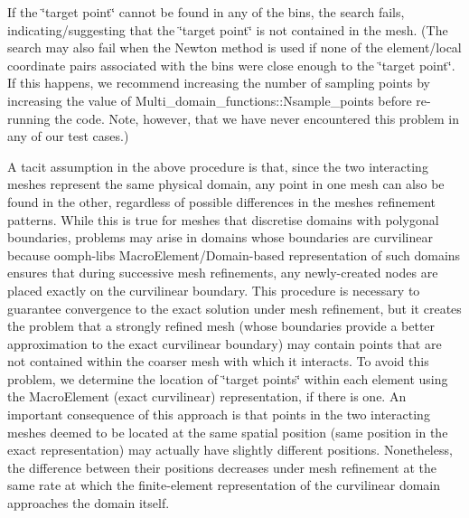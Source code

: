 \begin{DoxyEnumerate}
\item If the \char`\"{}target point\char`\"{} cannot be found in any of the bins, the search fails, indicating/suggesting that the \char`\"{}target point\char`\"{} is not contained in the mesh. (The search may also fail when the Newton method is used if none of the element/local coordinate pairs associated with the bins were close enough to the \char`\"{}target point\char`\"{}. If this happens, we recommend increasing the number of sampling points by increasing the value of {\ttfamily Multi\+\_\+domain\+\_\+functions\+::\+Nsample\+\_\+points} before re-\/running the code. Note, however, that we have never encountered this problem in any of our test cases.)
\end{DoxyEnumerate}A tacit assumption in the above procedure is that, since the two interacting meshes represent the same physical domain, any point in one mesh can also be found in the other, regardless of possible differences in the meshes\textquotesingle{} refinement patterns. While this is true for meshes that discretise domains with polygonal boundaries, problems may arise in domains whose boundaries are curvilinear because {\ttfamily oomph-\/lib\textquotesingle{}s} {\ttfamily Macro\+Element/\+Domain}-\/based representation of such domains ensures that during successive mesh refinements, any newly-\/created nodes are placed exactly on the curvilinear boundary. This procedure is necessary to guarantee convergence to the exact solution under mesh refinement, but it creates the problem that a strongly refined mesh (whose boundaries provide a better approximation to the exact curvilinear boundary) may contain points that are not contained within the coarser mesh with which it interacts. To avoid this problem, we determine the location of \char`\"{}target points\char`\"{} within each element using the {\ttfamily Macro\+Element} (exact curvilinear) representation, if there is one. An important consequence of this approach is that points in the two interacting meshes deemed to be located at the same spatial position (same position in the exact representation) may actually have slightly different positions. Nonetheless, the difference between their positions decreases under mesh refinement at the same rate at which the finite-\/element representation of the curvilinear domain approaches the domain itself.



